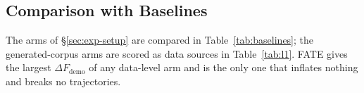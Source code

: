 \subsection{Comparison with Baselines}\label{sec:exp-baselines}
The arms of \S\ref{sec:exp-setup} are compared in Table~\ref{tab:baselines};
the generated-corpus arms are scored as data sources in Table~\ref{tab:l1}. FATE gives the largest $\Delta F_{\mathrm{demo}}$ of any
data-level arm and is the only one that inflates nothing and breaks no
trajectories.

